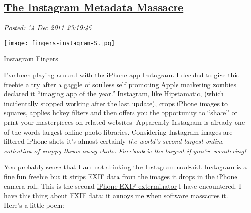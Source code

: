 %

\subsection*{\href{https://bakerjd99.wordpress.com/2011/12/14/the-instagram-metadata-massacre/}{The Instagram Metadata Massacre}}


\noindent\emph{Posted: 14 Dec 2011 23:19:45}
\vspace{6pt}


\captionsetup[floatingfigure]{labelformat=empty}
\begin{floatingfigure}[r]{0.23\textwidth}
\centering
\href{http://conceptcontrol.smugmug.com/Themes/Diaries/Cell-Phoning-It-In/17756793\_PfCsJz}{\texttt{[image: fingers-instagram-S.jpg]}}
\caption{Instagram  Fingers}
\label{fig:2287X0}
\end{floatingfigure}I've been playing around with the iPhone app
\href{http://itunes.apple.com/us/app/instagram/id389801252?mt=8}{Instagram}.
I decided to give this freebie a try after a gaggle of soulless self
promoting Apple marketing zombies declared it
``imaging \href{http://articles.businessinsider.com/2011-12-08/tech/30489467\_1\_android-apps-ipad}{app
of the year}.'' Instagram, like
\href{http://hipstamatic.com/the\_app.html}{Hipstamatic}, (which
incidentally stopped working after the last update), crops iPhone images
to squares, applies hokey filters and then offers you the opportunity to
``share'' or print your masterpieces on related websites. Apparently
Instagram is already one of the words largest online photo libraries.
Considering Instagram images are filtered iPhone shots it's almost
certainly \emph{the world's second largest online collection of crappy
throw-away shots. Facebook is the largest if you're wondering!}

You probably sense that I am not drinking the Instagram cool-aid.
Instagram is a fine fun freebie but it strips EXIF data from the images
it drops in the iPhone camera roll. This is the
second \href{http://bakerjd99.wordpress.com/2011/04/03/smugshot-metadata-mess/}{iPhone
EXIF exterminator} I have encountered. I have this thing about EXIF
data; it annoys me when software massacres it.
Here's a little poem:

